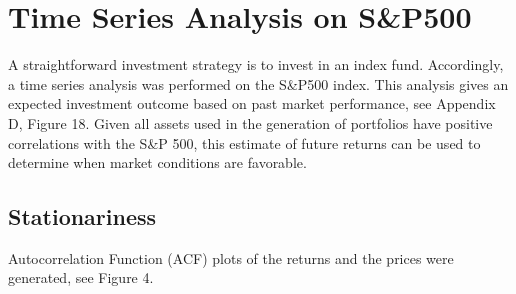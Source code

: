 \documentclass[10pt]{article_simple}
\begin{document}
\section*{Time Series Analysis on S\&P500}

A straightforward investment strategy is to invest in an index fund. Accordingly, a time series analysis was performed on the S\&P500 index. This analysis gives an expected investment outcome based on past market performance,  see Appendix D, Figure 18. Given all assets used in the generation of portfolios have positive correlations with the S\&P 500, this estimate of future returns can be used to determine when market conditions are favorable.

\subsection*{Stationariness}
Autocorrelation Function (ACF) plots of the returns and the prices were generated, see Figure 4.
\end{document}
